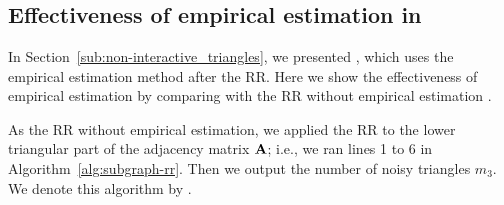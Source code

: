 \graphicspath{{./chapters/chapter1/}}
\chapter{ }




\section{Effectiveness of empirical estimation in }
\label{sec:RR_emp}
In Section~\ref{sub:non-interactive_triangles}, we presented , which uses the empirical estimation method after the RR. 
Here we show the effectiveness of empirical estimation by comparing  with the RR without empirical estimation \cite{Qin_CCS17,Ye_ICDE20}. 

As the RR without empirical estimation, we applied the RR to the lower triangular part of the adjacency matrix $\mathbf{A}$; i.e., we ran lines 1 to 6 in Algorithm~\ref{alg:subgraph-rr}. 
Then we output the number of noisy triangles $m_3$. 
We denote this algorithm by . 

